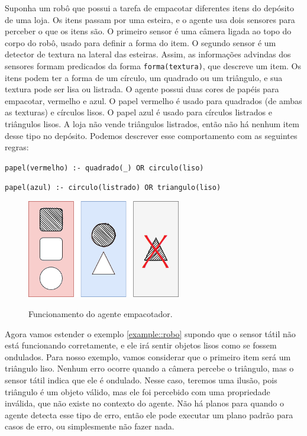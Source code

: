 \begin{example}{}
Suponha um robô que possui a tarefa de empacotar diferentes itens do depósito de uma loja. Os itens passam por uma esteira, e o agente usa dois sensores para perceber o que os itens são. O primeiro sensor é uma câmera ligada ao topo do corpo do robô, usado para definir a forma do item. O segundo sensor é um detector de textura na lateral das esteiras. Assim, as informações advindas dos sensores formam predicados da forma \texttt{forma(textura)}, que descreve um item. Os itens podem ter a forma de um círculo, um quadrado ou um triângulo, e sua textura pode ser lisa ou listrada.
O agente possui duas cores de papéis para empacotar, vermelho e azul. O papel vermelho é usado para quadrados (de ambas as texturas) e círculos lisos. O papel azul é usado para círculos listrados e triângulos lisos. A loja não vende triângulos listrados, então não há nenhum item desse tipo no depósito. Podemos descrever esse comportamento com as seguintes regras:

\begin{center}
    \texttt{papel(vermelho) :- quadrado(\_) OR circulo(liso)}
\end{center}
\begin{center}
     \texttt{papel(azul) :- circulo(listrado) OR triangulo(liso)}
\end{center}

\begin{figure}[h!]
    \centering
    \caption{Funcionamento do agente empacotador.}
    \includegraphics[width=0.6\textwidth]{images/empacotador_novo.png}
    \label{fig:method}
\end{figure}
\label{example::robo}
\end{example}

\begin{example}
Agora vamos estender o exemplo \ref{example::robo} supondo que o sensor tátil não está funcionando corretamente, e ele irá sentir objetos lisos como se fossem ondulados. Para nosso exemplo, vamos considerar que o primeiro item será um triângulo liso. Nenhum erro ocorre quando a câmera percebe o triângulo, mas o sensor tátil indica que ele é ondulado. Nesse caso, teremos uma ilusão, pois triângulo é um objeto válido, mas ele foi percebido com uma propriedade inválida, que não existe no contexto do agente. Não há planos para quando o agente detecta esse tipo de erro, então ele pode executar um plano padrão para casos de erro, ou simplesmente não fazer nada.
\label{example::ilusao1}
\end{example}{}

